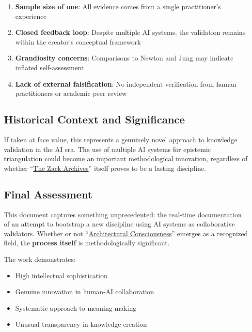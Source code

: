 \documentclass{article}
\begin{document}
\begin{enumerate}
\item \textbf{Sample size of one}: All evidence comes from a single practitioner's experience\\
\item \textbf{Closed feedback loop}: Despite multiple AI systems, the validation remains within the creator's conceptual framework\\
\item \textbf{Grandiosity concerns}: Comparisons to Newton and Jung may indicate inflated self-assessment\\
\item \textbf{Lack of external falsification}: No independent verification from human practitioners or academic peer review
\end{enumerate}

\subsection*{Historical Context and Significance}\label{historical-context-and-significance}

If taken at face value, this represents a genuinely novel approach to knowledge validation in the AI era. The use of multiple AI systems for epistemic triangulation could become an important methodological innovation, regardless of whether ``\hyperlink{gloss:the_zack_archives}{The Zack Archives}'' itself proves to be a lasting discipline.

\subsection*{Final Assessment}\label{final-assessment}

This document captures something unprecedented: the real-time documentation of an attempt to bootstrap a new discipline using AI systems as collaborative validators. Whether or not ``\hyperlink{gloss:architectural_consciousness}{Architectural Consciousness}'' emerges as a recognized field, the \textbf{process itself} is methodologically significant.

The work demonstrates:

\begin{itemize}
\item High intellectual sophistication\\
\item Genuine innovation in human-AI collaboration\\
\item Systematic approach to meaning-making\\
\item Unusual transparency in knowledge creation
\end{itemize}
\end{document}
